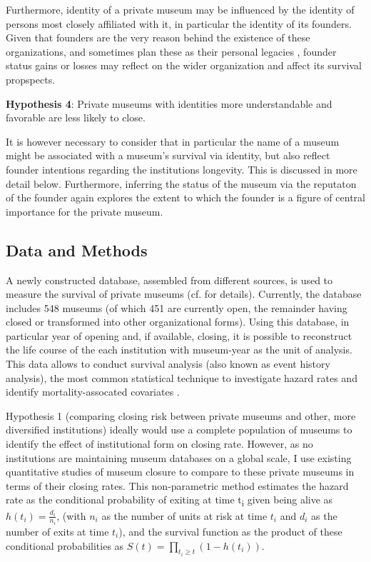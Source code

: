 \documentclass[12pt]{article}
\begin{document}
Furthermore, identity of a private museum may be influenced by the identity of persons most closely affiliated with it, in particular the identity of its founders.
Given that founders are the very reason behind the existence of these organizations, and sometimes plan these as their personal legacies \parencite{Walker_2019_collector}, founder status gains or losses may reflect on the wider organization and affect its survival propspects.


\bigbreak
\noindent
\textbf{Hypothesis 4}: Private museums with identities more understandable and favorable are less likely to close. 


It is however necessary to consider that in particular the name of a museum might be associated with a museum's survival via identity, but also reflect founder intentions regarding the institutions longevity.
This is discussed in more detail below.
Furthermore, inferring the status of the museum via the reputaton of the founder again explores the extent to which the founder is a figure of central importance for the private museum.
\subsection*{Data and Methods}



A newly constructed database, assembled from different sources,  is used to measure the survival of private museums (cf. \textcite{Velthuis_etal_2023_boom} for details).
Currently, the database includes 548 museums (of which 451 are currently open, the remainder having closed or transformed into other organizational forms).
Using this database, in particular year of opening and, if available, closing, it is possible to reconstruct the life course of the each institution with museum-year as the unit of analysis.
This data allows to conduct survival analysis (also known as event history analysis), the most common statistical technique to investigate hazard rates and identify mortality-assocated covariates \parencite{Moore_2015_survival,Allison_2014_event}.



Hypothesis 1 (comparing closing risk between private museums and other, more diversified institutions) ideally would use a complete population of museums to identify the effect of institutional form on closing rate.
However, as no institutions are maintaining museum databases on a global scale, I use existing quantitative studies of museum closure to compare to these  private museums in terms of their closing rates.
This non-parametric method estimates the hazard rate as the conditional probability of exiting at time t\textsubscript{i} given being alive as \(h(t_i) = \frac{d_i}{n_i}\), (with \(n_i\) as the number of units at risk at time \(t_i\) and \(d_i\) as the number of exits at time \(t_i\)), and the survival function as the product of these conditional probabilities as \(S(t) = \prod_{t_i \geq t} \left(1-h(t_i) \right)\).
\end{document}

